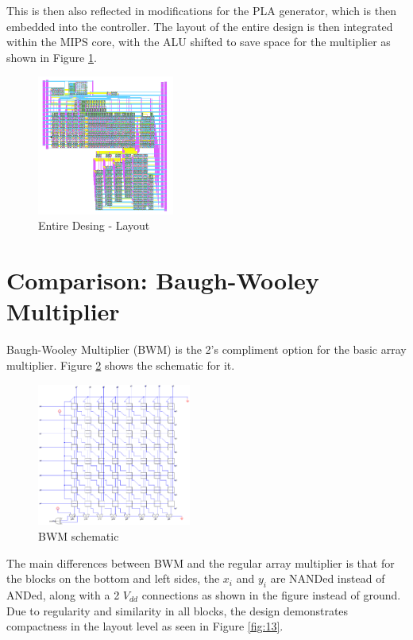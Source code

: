 \documentclass[journal]{IEEEtran}
\begin{document}
This is then also reflected in modifications for the PLA generator, which is then embedded into the controller. The layout of the entire design is then integrated within the MIPS core, with the ALU shifted to save space for the multiplier as shown in Figure \ref{fig:11}.

\begin{figure}[h!]
  \centering
  \includegraphics[width=0.4\textwidth]{11.png}
  \centering
  \caption{Entire Desing - Layout}
  \label{fig:11}
\end{figure}


\section{Comparison: Baugh-Wooley Multiplier}

Baugh-Wooley Multiplier (BWM) is the 2's compliment option for the basic array multiplier. Figure \ref{fig:12} shows the schematic for it.

\vspace{-10pt}

\begin{figure}[h!]
  \centering
  \includegraphics[width=0.45\textwidth]{12.png}
  \centering
  \caption{BWM schematic}
  \label{fig:12}
\end{figure}


The main differences between BWM and the regular array multiplier is that for the blocks on the bottom and left sides, the $x_{i}$ and $y_{i}$ are NANDed instead of ANDed, along with a 2 $V_{dd}$ connections as shown in the figure instead of ground. Due to regularity and similarity in all blocks, the design demonstrates compactness in the layout level as seen in Figure \ref{fig:13}.
\end{document}
